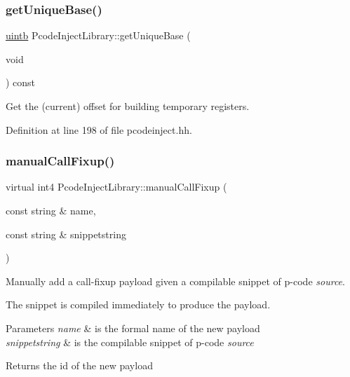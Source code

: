 \subsubsection{\texorpdfstring{getUniqueBase()}{getUniqueBase()}}
{\footnotesize\ttfamily \mbox{\hyperlink{types_8h_a2db313c5d32a12b01d26ac9b3bca178f}{uintb}} Pcode\+Inject\+Library\+::get\+Unique\+Base (\begin{DoxyParamCaption}\item[{void}]{ }\end{DoxyParamCaption}) const\hspace{0.3cm}{\ttfamily [inline]}}



Get the (current) offset for building temporary registers. 



Definition at line 198 of file pcodeinject.\+hh.

\mbox{\label{class_pcode_inject_library_a0e360443cbc6ff94ea71d197882c55a8}} 
\subsubsection{\texorpdfstring{manualCallFixup()}{manualCallFixup()}}
{\footnotesize\ttfamily virtual int4 Pcode\+Inject\+Library\+::manual\+Call\+Fixup (\begin{DoxyParamCaption}\item[{const string \&}]{name,  }\item[{const string \&}]{snippetstring }\end{DoxyParamCaption})\hspace{0.3cm}{\ttfamily [pure virtual]}}



Manually add a call-\/fixup payload given a compilable snippet of p-\/code {\itshape source}. 

The snippet is compiled immediately to produce the payload. 
\begin{DoxyParams}{Parameters}
{\em name} & is the formal name of the new payload \\
\hline
{\em snippetstring} & is the compilable snippet of p-\/code {\itshape source} \\
\hline
\end{DoxyParams}
\begin{DoxyReturn}{Returns}
the id of the new payload 
\end{DoxyReturn}


